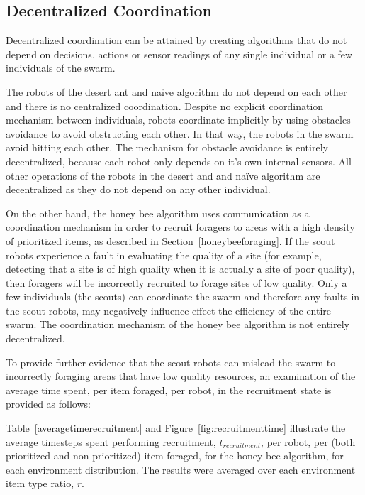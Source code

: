 \subsection{Decentralized Coordination}
\label{results:decentralizedcoordination}

Decentralized coordination can be attained by creating algorithms that do not depend on decisions, actions or sensor readings of any single individual or a few individuals of the swarm. 

The robots of the desert ant and na\"ive algorithm do not depend on each other and there is no centralized coordination. Despite no explicit coordination mechanism between individuals, robots coordinate implicitly by using obstacles avoidance to avoid obstructing each other. In that way, the robots in the swarm avoid hitting each other. The mechanism for obstacle avoidance is entirely decentralized, because each robot only depends on it's own internal sensors. All other operations of the robots in the desert and and na\"ive algorithm are decentralized as they do not depend on any other individual.

On the other hand, the honey bee algorithm uses communication as a coordination mechanism in order to recruit foragers to areas with a high density of prioritized items, as described in Section~\ref{honeybeeforaging}. If the scout robots experience a fault in evaluating the quality of a site (for example, detecting that a site is of high quality when it is actually a site of poor quality), then foragers will be incorrectly recruited to forage sites of low quality. Only a few individuals (the scouts) can coordinate the swarm and therefore any faults in the scout robots, may negatively influence effect the efficiency of the entire swarm. The coordination mechanism of the honey bee algorithm is not entirely decentralized.


To provide further evidence that the scout robots can mislead the swarm to incorrectly foraging areas that have low quality resources, an examination of the average time spent, per item foraged, per robot, in the recruitment state is provided as follows: 

Table~\ref{averagetimerecruitment} and Figure~\ref{fig:recruitmenttime} illustrate the average timesteps spent performing recruitment, $t_{recruitment}$, per robot, per (both prioritized and non-prioritized) item foraged, for the honey bee algorithm, for each environment distribution. The results were averaged over each environment item type ratio, $r$. 

